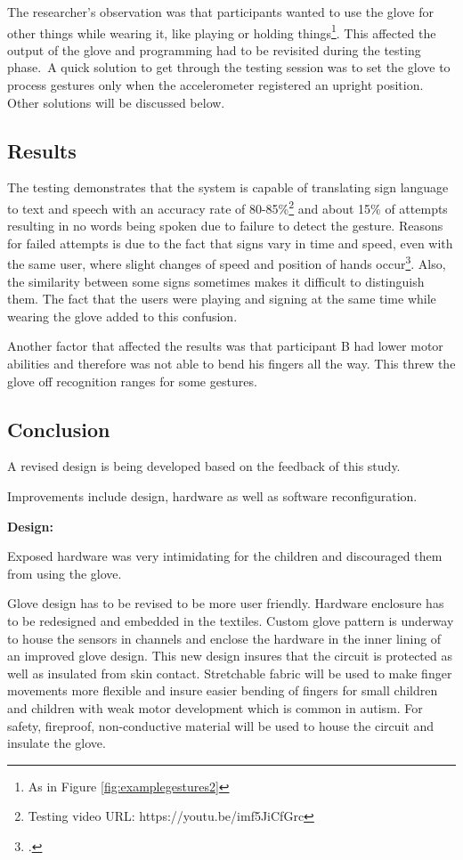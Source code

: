 The researcher's observation was that participants wanted to use the glove for other things while wearing it, like playing or holding things\footnote{As in Figure \ref{fig:examplegestures2}}. This affected the output of the glove and programming had to be revisited during the testing phase. A quick solution to get through the testing session was to set the glove to process gestures only when the accelerometer registered an upright position. Other solutions will be discussed below. 

\subsection{Results}

The testing demonstrates that the system is capable of translating sign language to text and speech with an accuracy rate of 80-85\%\footnote{Testing video URL: https://youtu.be/imf5JiCfGrc} and about 15\% of attempts resulting in no words being spoken due to failure to detect the gesture. Reasons for failed attempts is due to the fact that signs vary in time and speed, even with the same user, where slight changes of speed and position of hands occur\footcite{Premaratne2010}. Also, the similarity between some signs sometimes makes it difficult to distinguish them. The fact that the users were playing and signing at the same time while wearing the glove added to this confusion. 

Another factor that affected the results was that participant B had lower motor abilities and therefore was not able to bend his fingers all the way. This threw the glove off recognition ranges for some gestures.

\subsection{Conclusion}

A revised design is being developed based on the feedback of this study. 

Improvements include design, hardware as well as software reconfiguration. 

\textbf{Design:}

Exposed hardware was very intimidating for the children and discouraged them from using the glove.

Glove design has to be revised to be more user friendly. Hardware enclosure has to be redesigned and embedded in the textiles. Custom glove pattern is underway to house the sensors in channels and enclose the hardware in the inner lining of an improved glove design. This new design insures that the circuit is protected as well as insulated from skin contact. Stretchable fabric will be used to make finger movements more flexible and insure easier bending of fingers for small children and children with weak motor development which is common in autism. For safety, fireproof, non-conductive material will be used to house the circuit and insulate the glove.

